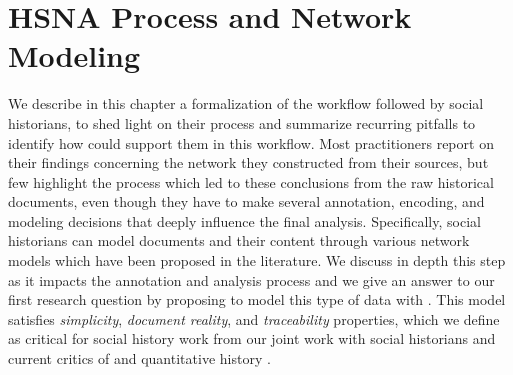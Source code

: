\chapter{HSNA Process and Network Modeling}\label{ch:hsna-process-and-network-modeling}

We describe in this chapter a formalization of the \hsna workflow followed by social historians, to shed light on their process and summarize recurring pitfalls to identify how \va could support them in this workflow.
Most \hsna practitioners report on their findings concerning the network they constructed from their sources, but few highlight the process which led to these conclusions from the raw historical documents, even though they have to make several annotation, encoding, and modeling decisions that deeply influence the final analysis\cite{alkadi2022}.
Specifically, social historians can model documents and their content through various network models which have been proposed in the literature.
We discuss in depth this step as it impacts the annotation and analysis process and we give an answer to our first research question \qone by proposing to model this type of data with \modelplural.
This model satisfies \emph{simplicity}, \emph{document reality}, and \emph{traceability} properties, which we define as critical for social history work from our joint work with social historians and current critics of \hsna and quantitative history \cite{lemercier12FormalNetwork2015, lemercierBackSourcesPracticing2021}. 




